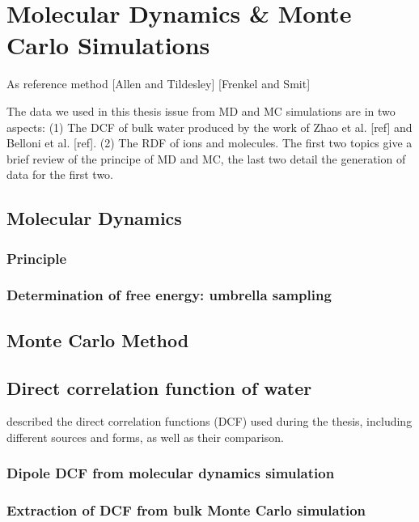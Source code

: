 
\chapter{Molecular Dynamics \& Monte Carlo Simulations\label{chpt:reference-method}}

As reference method {[}Allen and Tildesley{]} {[}Frenkel and Smit{]}

The data we used in this thesis issue from \acs{MD} and \acs{MC}
simulations are in two aspects: (1) The \acs{DCF} of bulk water produced
by the work of Zhao et al. {[}ref{]} and Belloni et al. {[}ref{]}.
(2) The \acf{RDF} of ions and molecules. The first two topics give
a brief review of the principe of \acs{MD} and \acs{MC}, the last
two detail the generation of data for the first two.


\section{Molecular Dynamics}


\subsection{Principle}


\subsection{Determination of free energy: umbrella sampling}


\section{Monte Carlo Method}


\section{Direct correlation function of water}

described the direct correlation functions (\acs{DCF}) used during
the thesis, including different sources and forms, as well as their
comparison.


\subsection{Dipole DCF from molecular dynamics simulation}


\subsection{Extraction of DCF from bulk Monte Carlo simulation}

